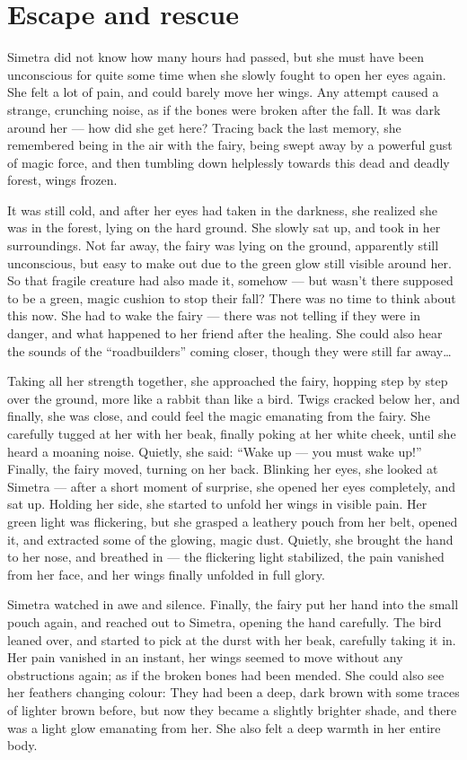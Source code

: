 \chapter{Escape and rescue}
\label{cha:escape-rescue}
Simetra did not know how many hours had passed, but she must have been unconscious for quite some time when she slowly fought to open her eyes again.
She felt a lot of pain, and could barely move her wings. Any attempt caused a strange, crunching noise, as if the bones were broken after the fall. It was dark around her --- how did she get here? Tracing back the last memory, she remembered being in the air with the fairy, being swept away by a powerful gust of magic force, and then tumbling down helplessly towards this dead and deadly forest, wings frozen.

It was still cold, and after her eyes had taken in the darkness, she realized she was in the forest, lying on the hard ground. She slowly sat up, and took in her surroundings. Not far away, the fairy was lying on the ground, apparently still unconscious, but easy to make out due to the green glow still visible around her. So that fragile creature had also made it, somehow --- but wasn't there supposed to be a green, magic cushion to stop their fall?
There was no time to think about this now. She had to wake the fairy --- there was not telling if they were in danger, and what happened to her friend after the healing. She could also hear the sounds of the \enquote{roadbuilders} coming closer, though they were still far away\dots

Taking all her strength together, she approached the fairy, hopping step by step over the ground, more like a rabbit than like a bird. Twigs cracked below her, and finally, she was close, and could feel the magic emanating from the fairy. She carefully tugged at her with her beak, finally poking at her white cheek, until she heard a moaning noise. Quietly, she said: \enquote{Wake up --- you must wake up!} Finally, the fairy moved, turning on her back. Blinking her eyes, she looked at Simetra --- after a short moment of surprise, she opened her eyes completely, and sat up. Holding her side, she started to unfold her wings in visible pain. Her green light was flickering, but she grasped a leathery pouch from her belt, opened it, and extracted some of the glowing, magic dust. Quietly, she brought the hand to her nose, and breathed in --- the flickering light stabilized, the pain vanished from her face, and her wings finally unfolded in full glory.

Simetra watched in awe and silence. Finally, the fairy put her hand into the small pouch again, and reached out to Simetra, opening the hand carefully. The bird leaned over, and started to pick at the durst with her beak, carefully taking it in. Her pain vanished in an instant, her wings seemed to move without any obstructions again; as if the broken bones had been mended. She could also see her feathers changing colour: They had been a deep, dark brown with some traces of lighter brown before, but now they became a slightly brighter shade, and there was a light glow emanating from her. She also felt a deep warmth in her entire body.

